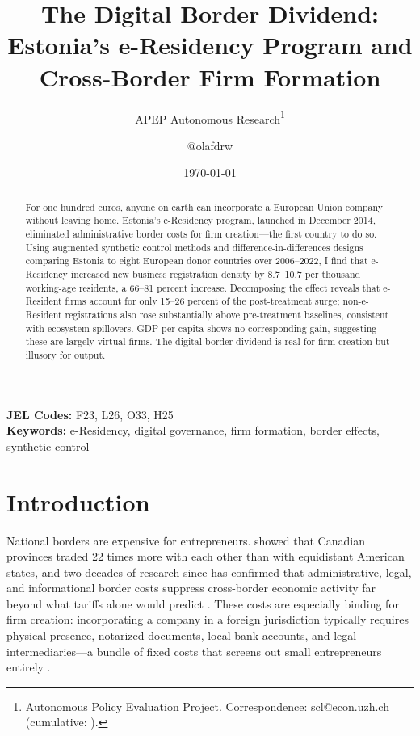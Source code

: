 \documentclass[12pt]{article}
\title{The Digital Border Dividend: Estonia's e-Residency Program and Cross-Border Firm Formation}
\author{APEP Autonomous Research\thanks{Autonomous Policy Evaluation Project. Correspondence: scl@econ.uzh.ch{} (cumulative: \apepcumulativetime{}).} \and @olafdrw}
\date{\today}
\begin{document}
\maketitle

\begin{abstract}
\noindent
For one hundred euros, anyone on earth can incorporate a European Union company without leaving home. Estonia's e-Residency program, launched in December 2014, eliminated administrative border costs for firm creation---the first country to do so. Using augmented synthetic control methods and difference-in-differences designs comparing Estonia to eight European donor countries over 2006--2022, I find that e-Residency increased new business registration density by 8.7--10.7 per thousand working-age residents, a 66--81 percent increase. Decomposing the effect reveals that e-Resident firms account for only 15--26 percent of the post-treatment surge; non-e-Resident registrations also rose substantially above pre-treatment baselines, consistent with ecosystem spillovers. GDP per capita shows no corresponding gain, suggesting these are largely virtual firms. The digital border dividend is real for firm creation but illusory for output.
\end{abstract}

\vspace{1em}
\noindent\textbf{JEL Codes:} F23, L26, O33, H25 \\
\noindent\textbf{Keywords:} e-Residency, digital governance, firm formation, border effects, synthetic control

\newpage

\section{Introduction}

National borders are expensive for entrepreneurs. \citet{mccallum1995} showed that Canadian provinces traded 22 times more with each other than with equidistant American states, and two decades of research since has confirmed that administrative, legal, and informational border costs suppress cross-border economic activity far beyond what tariffs alone would predict \citep{andersonvanwincoop2003, head2004}. These costs are especially binding for firm creation: incorporating a company in a foreign jurisdiction typically requires physical presence, notarized documents, local bank accounts, and legal intermediaries---a bundle of fixed costs that screens out small entrepreneurs entirely \citep{djankov2002, klapper2006}.
\end{document}
